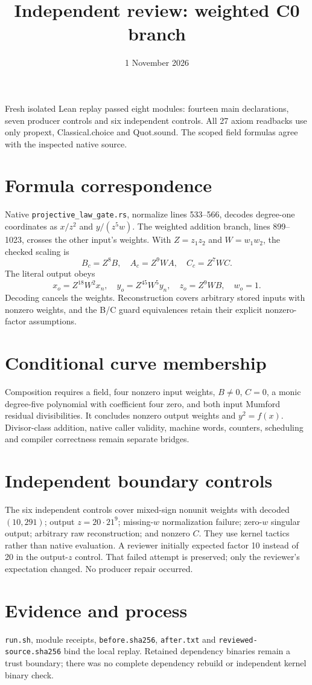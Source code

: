 \documentclass[10pt]{article}
\title{Independent review: weighted C0 branch}
\date{1 November 2026}
\begin{document}
\maketitle
Fresh isolated Lean replay passed eight modules: fourteen main declarations, seven producer controls and six independent controls. All 27 axiom readbacks use only propext, Classical.choice and Quot.sound. The scoped field formulas agree with the inspected native source.
\section*{Formula correspondence}
Native \texttt{projective\_law\_gate.rs}, normalize lines 533--566, decodes degree-one coordinates as $x/z^2$ and $y/(z^5w)$. The weighted addition branch, lines 899--1023, crosses the other input's weights. With $Z=z_1z_2$ and $W=w_1w_2$, the checked scaling is
\[B_c=Z^8B,\quad A_c=Z^9WA,\quad C_c=Z^7WC.\]
The literal output obeys
\[x_o=Z^{18}W^2x_n,\quad y_o=Z^{45}W^5y_n,\quad z_o=Z^9WB,\quad w_o=1.\]
Decoding cancels the weights. Reconstruction covers arbitrary stored inputs with nonzero weights, and the B/C guard equivalences retain their explicit nonzero-factor assumptions.
\section*{Conditional curve membership}
Composition requires a field, four nonzero input weights, $B\ne0$, $C=0$, a monic degree-five polynomial with coefficient four zero, and both input Mumford residual divisibilities. It concludes nonzero output weights and $y^2=f(x)$. Divisor-class addition, native caller validity, machine words, counters, scheduling and compiler correctness remain separate bridges.
\section*{Independent boundary controls}
The six independent controls cover mixed-sign nonunit weights with decoded $(10,291)$; output $z=20\cdot21^9$; missing-$w$ normalization failure; zero-$w$ singular output; arbitrary raw reconstruction; and nonzero $C$. They use kernel tactics rather than native evaluation. A reviewer initially expected factor 10 instead of 20 in the output-$z$ control. That failed attempt is preserved; only the reviewer's expectation changed. No producer repair occurred.
\section*{Evidence and process}
\texttt{run.sh}, module receipts, \texttt{before.sha256}, \texttt{after.txt} and \texttt{reviewed-source.sha256} bind the local replay. Retained dependency binaries remain a trust boundary; there was no complete dependency rebuild or independent kernel binary check.
\end{document}
